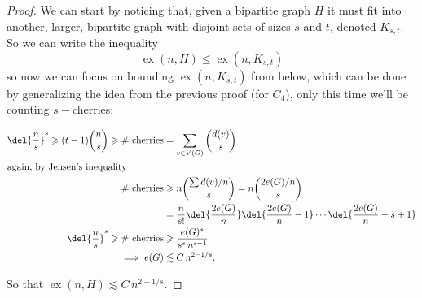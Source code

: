 \documentclass[english, dark, index]{Iart}
\DeclareMathOperator{\ex}{ex}
\begin{document}
	\begin{proof}
		We can start by noticing that, given a bipartite graph $ H $ it must fit into another, larger, bipartite graph with disjoint sets of sizes $ s $ and $ t $, denoted $ K_{s,t} $. So we can write the inequality
		\[ \ex(n,H)\leqslant \ex(n,K_{s,t}) \]
		so now we can focus on bounding $ \ex(n,K_{s,t}) $ from below, which can be done by generalizing the idea from the previous proof (for $ C_4 $), only this time we'll be counting $ s- $cherries:
		
		\begin{ruledfig}
			
			\center
			
		\end{ruledfig}
	
		
		\begin{align*}
			\del{\dfrac{n}{s}}^{s}\geqslant (t-1)\binom{n}{s}\geqslant\textup{\# cherries}&=\sum_{v\in V(G)}\binom{d(v)}{s}\\
			\intertext{again, by Jensen's inequality}
			\textup{\# cherries}&\geqslant n\binom{\sum d(v)/n}{s}=n\binom{2e(G)/n}{s}\\
			&= \dfrac{n}{s!}\del{\dfrac{2e(G)}{n}}\del{\dfrac{2e(G)}{n}-1}\cdots \del{\dfrac{2e(G)}{n}-s+1}\\
			\del{\dfrac{n}{s}}^{s}\geqslant\textup{\# cherries}&\geqslant \dfrac{e(G)^{s}}{s^{s}\,n^{s-1}}\\
			\implies e(G)&\lesssim C\,n^{2-1/s}.
		\end{align*}
	
		So that $ \ex(n,H)\lesssim C\,n^{2-1/s} $.
	\end{proof}
\end{document}
